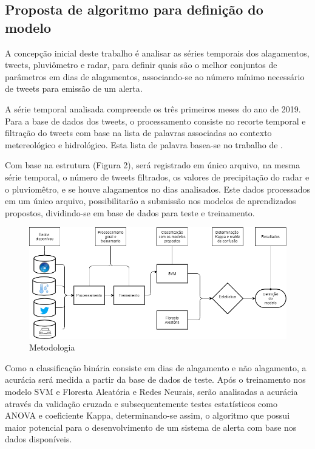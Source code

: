 \subsection{Proposta de algoritmo para definição do modelo}
A concepção inicial deste trabalho é analisar as séries temporais  dos alagamentos, tweets, pluviômetro e radar, para definir quais são o melhor conjuntos de parâmetros em dias de alagamentos, associando-se ao número mínimo necessário de tweets para emissão de um alerta. 
\par A série temporal analisada compreende os três primeiros meses do ano de 2019. Para a base de dados dos tweets, o processamento consiste no recorte temporal e filtração do tweets com base na lista de palavras associadas ao contexto metereológico e hidrológico. Esta lista de palavra basea-se no trabalho de \cite{de2021effect}. 
\par Com base na estrutura (Figura 2), será registrado em único arquivo, na mesma série temporal, o número de tweets filtrados, os valores de precipitação do radar e o pluviomêtro, e se houve alagamentos no dias analisados. Este dados processados em um único arquivo, possibilitarão a submissão nos modelos de aprendizados propostos, dividindo-se em base de dados para teste e treinamento.  
\begin{figure}[H]
    \centering
    \includegraphics[scale=0.6]{imagens/att2.drawio.png}
    \caption{Metodologia}
    \label{fig:my_label}
\end{figure}
\par Como a classificação binária consiste em dias de alagamento e não alagamento, a acurácia será medida a partir da base de dados de teste. Após o treinamento nos modelo SVM e Floresta Aleatória e Redes Neurais, serão analisadas a acurácia através da validação cruzada e subsequentemente testes estatísticos como ANOVA e coeficiente Kappa, determinando-se assim, o algoritmo que possui maior potencial para o desenvolvimento de um sistema de alerta com base nos dados disponíveis. 
